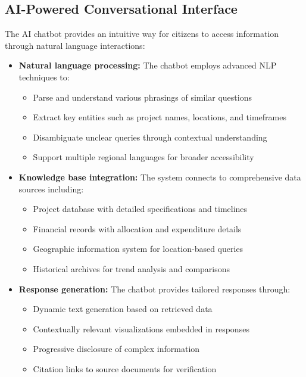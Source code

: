 \documentclass[12pt,a4paper]{report}
\begin{document}
\subsection{AI-Powered Conversational Interface}
\indent \indent The AI chatbot provides an intuitive way for citizens to access information through natural language interactions:

\begin{itemize}
    \item \textbf{Natural language processing:} The chatbot employs advanced NLP techniques to:
    \begin{itemize}
        \item Parse and understand various phrasings of similar questions
        \item Extract key entities such as project names, locations, and timeframes
        \item Disambiguate unclear queries through contextual understanding
        \item Support multiple regional languages for broader accessibility
    \end{itemize}
    
    \item \textbf{Knowledge base integration:} The system connects to comprehensive data sources including:
    \begin{itemize}
        \item Project database with detailed specifications and timelines
        \item Financial records with allocation and expenditure details
        \item Geographic information system for location-based queries
        \item Historical archives for trend analysis and comparisons
    \end{itemize}
    
    \item \textbf{Response generation:} The chatbot provides tailored responses through:
    \begin{itemize}
        \item Dynamic text generation based on retrieved data
        \item Contextually relevant visualizations embedded in responses
        \item Progressive disclosure of complex information
        \item Citation links to source documents for verification
    \end{itemize}
    

\end{itemize}
\end{document}
